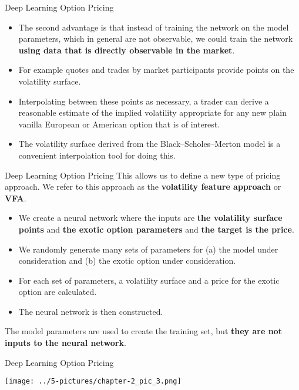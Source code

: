 \documentclass[11pt]{beamer}
\begin{document}
\begin{frame}{Deep Learning Option Pricing}
	\begin{itemize}
		\item The second advantage is that instead of training the network on the model parameters, which in general are not observable, we could train the network \textbf{using data that is directly observable in the market}. 
		\item For example quotes and trades by market participants provide points on the
volatility surface. 
\item Interpolating between these points as necessary, a trader can derive a reasonable
estimate of the implied volatility appropriate for any new plain vanilla European or American option that is of interest. 
\item The volatility surface derived from the Black–Scholes–Merton model is a convenient interpolation tool for doing this.

	\end{itemize}
\end{frame}
\begin{frame}{Deep Learning Option Pricing}
This allows us to define a new type of pricing approach. We refer to this approach as the \textbf{volatility feature approach} or \textbf{VFA}.
	\begin{itemize}
		\item We create a neural
network where the inputs are \textbf{the volatility surface points} and \textbf{the exotic option parameters} and \textbf{the
target is the price}. 
\item We randomly generate many sets of parameters for (a) the model under
consideration and (b) the exotic option under consideration. 
\item For each set of parameters, a volatility
surface and a price for the exotic option are calculated. 
\item The neural network is then constructed.
	\end{itemize}
The model parameters are used to create the training set, but \textbf{they are not inputs to the neural network}.
\end{frame}
\begin{frame}{Deep Learning Option Pricing}
\begin{center}
\texttt{[image: ../5-pictures/chapter-2\_pic\_3.png]} 
\end{center}
\end{frame}
\end{document}
